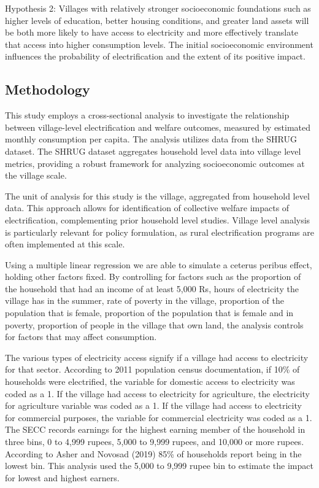 \documentclass[
]{article}
\begin{document}
Hypothesis 2: Villages with relatively stronger socioeconomic
foundations such as higher levels of education, better housing
conditions, and greater land assets will be both more likely to have
access to electricity and more effectively translate that access into
higher consumption levels. The initial socioeconomic environment
influences the probability of electrification and the extent of its
positive impact.

\hypertarget{methodology}{%
\subsection{Methodology}\label{methodology}}

This study employs a cross-sectional analysis to investigate the
relationship between village-level electrification and welfare outcomes,
measured by estimated monthly consumption per capita. The analysis
utilizes data from the SHRUG dataset. The SHRUG dataset aggregates
household level data into village level metrics, providing a robust
framework for analyzing socioeconomic outcomes at the village scale.

The unit of analysis for this study is the village, aggregated from
household level data. This approach allows for identification of
collective welfare impacts of electrification, complementing prior
household level studies. Village level analysis is particularly relevant
for policy formulation, as rural electrification programs are often
implemented at this scale.

Using a multiple linear regression we are able to simulate a ceterus
peribus effect, holding other factors fixed. By controlling for factors
such as the proportion of the household that had an income of at least
5,000 Rs, hours of electricity the village has in the summer, rate of
poverty in the village, proportion of the population that is female,
proportion of the population that is female and in poverty, proportion
of people in the village that own land, the analysis controls for
factors that may affect consumption.

The various types of electricity access signify if a village had access
to electricity for that sector. According to 2011 population census
documentation, if 10\% of households were electrified, the variable for
domestic access to electricity was coded as a 1. If the village had
access to electricity for agriculture, the electricity for agriculture
variable was coded as a 1. If the village had access to electricity for
commercial purposes, the variable for commercial electricity was coded
as a 1. The SECC records earnings for the highest earning member of the
household in three bins, 0 to 4,999 rupees, 5,000 to 9,999 rupees, and
10,000 or more rupees. According to Asher and Novosad (2019) 85\% of
households report being in the lowest bin. This analysis used the 5,000
to 9,999 rupee bin to estimate the impact for lowest and highest
earners.
\end{document}
